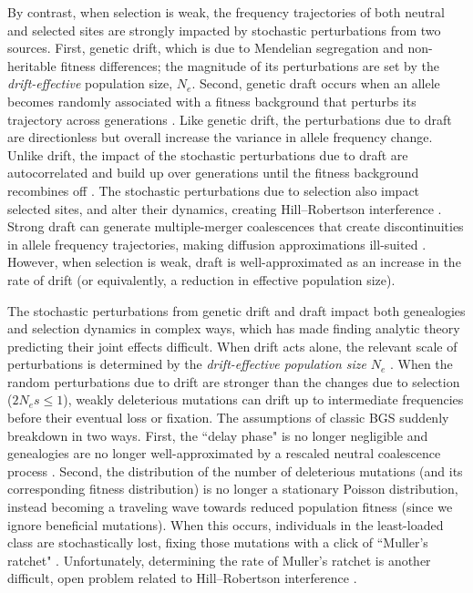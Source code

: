 \documentclass[11pt]{article}
\begin{document}
By contrast, when selection is weak, the frequency trajectories of both neutral
and selected sites are strongly impacted by stochastic perturbations from two
sources. First, genetic drift, which is due to Mendelian segregation and
non-heritable fitness differences; the magnitude of its perturbations are set
by the \emph{drift-effective} population size, $N_e$. Second, genetic draft
occurs when an allele becomes randomly associated with a fitness background
that perturbs its trajectory across generations
\parencite{Neher2013-dz,Gillespie2000-mh,Gillespie2001-mv}. Like genetic drift,
the perturbations due to draft are directionless but overall increase the
variance in allele frequency change. Unlike drift, the impact of the stochastic
perturbations due to draft are autocorrelated and build up over generations
until the fitness background recombines off
\parencite{Robertson1961-ho,Santiago1995-hx,Buffalo2019-qs}. The stochastic
perturbations due to selection also impact selected sites, and alter their
dynamics, creating Hill--Robertson interference \parencite{Hill1966-kd}. Strong
draft can generate multiple-merger coalescences that create discontinuities in
allele frequency trajectories, making diffusion approximations ill-suited
\parencite{Gillespie2000-mh,Der2011-it,Neher2013-dz}. However, when selection
is weak, draft is well-approximated as an increase in the rate of drift (or
equivalently, a reduction in effective population size).

The stochastic perturbations from genetic drift and draft impact both
genealogies and selection dynamics in complex ways, which has made finding
analytic theory predicting their joint effects difficult. When drift acts
alone, the relevant scale of perturbations is determined by the
\emph{drift-effective population size} $N_e$
\parencite{Ohta1971-gq,Ohta1992-yi}. When the random perturbations due to drift
are stronger than the changes due to selection ($2N_es \le 1$), weakly
deleterious mutations can drift up to intermediate frequencies before their
eventual loss or fixation. The assumptions of classic BGS suddenly breakdown in
two ways. First, the ``delay phase" is no longer negligible and genealogies are
no longer well-approximated by a rescaled neutral coalescence process
\parencite{Przeworski1999-mb,OFallon2010-my,Higgs1995-xc}. Second, the
distribution of the number of deleterious mutations (and its corresponding
fitness distribution) is no longer a stationary Poisson distribution, instead
becoming a traveling wave \parencite{Rouzine2008-qz,Good2013-lp,Gessler1995-hz}
towards reduced population fitness (since we ignore beneficial mutations). When
this occurs, individuals in the least-loaded class are stochastically lost,
fixing those mutations with a click of ``Muller's ratchet"
\parencite{Muller1964-ki,Charlesworth1997-qn}. Unfortunately, determining the
rate of Muller's ratchet is another difficult, open problem
\parencite{Haigh1978-gt,Gordo2002-dr,Gessler1995-hz} related to Hill--Robertson
interference \parencite{Felsenstein1974-xm}.
\end{document}
